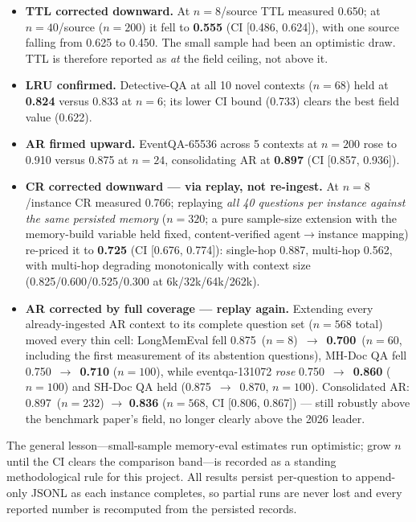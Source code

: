 \documentclass{article}
\begin{document}
\begin{itemize}
  \item \textbf{TTL corrected downward.} At $n{=}8$/source TTL measured 0.650;
        at $n{=}40$/source ($n{=}200$) it fell to \textbf{0.555}
        (CI [0.486, 0.624]), with one source falling from 0.625 to 0.450.
        The small sample had been an optimistic draw. TTL is therefore
        reported as \emph{at} the field ceiling, not above it.
  \item \textbf{LRU confirmed.} Detective-QA at all 10 novel contexts
        ($n{=}68$) held at \textbf{0.824} versus 0.833 at $n{=}6$; its lower
        CI bound (0.733) clears the best field value (0.622).
  \item \textbf{AR firmed upward.} EventQA-65536 across 5 contexts at
        $n{=}200$ rose to 0.910 versus 0.875 at $n{=}24$, consolidating AR at
        \textbf{0.897} (CI [0.857, 0.936]).
  \item \textbf{CR corrected downward --- via replay, not re-ingest.} At
        $n{=}8$/instance CR measured 0.766; replaying \emph{all 40 questions
        per instance against the same persisted memory} ($n{=}320$; a pure
        sample-size extension with the memory-build variable held fixed,
        content-verified agent$\to$instance mapping) re-priced it to
        \textbf{0.725} (CI [0.676, 0.774]): single-hop 0.887, multi-hop
        0.562, with multi-hop degrading monotonically with context size
        (0.825/0.600/0.525/0.300 at 6k/32k/64k/262k).
  \item \textbf{AR corrected by full coverage --- replay again.} Extending
        every already-ingested AR context to its complete question set
        ($n{=}568$ total) moved every thin cell: LongMemEval fell
        0.875~($n{=}8$)~$\to$~\textbf{0.700}~($n{=}60$, including the first
        measurement of its abstention questions), MH-Doc QA fell
        0.750~$\to$~\textbf{0.710} ($n{=}100$), while eventqa-131072
        \emph{rose} 0.750~$\to$~\textbf{0.860} ($n{=}100$) and SH-Doc QA held
        (0.875~$\to$~0.870, $n{=}100$). Consolidated AR: 0.897~($n{=}232$)
        $\to$ \textbf{0.836} ($n{=}568$, CI [0.806, 0.867]) --- still robustly
        above the benchmark paper's field, no longer clearly above the 2026
        leader.
\end{itemize}

The general lesson---small-sample memory-eval estimates run optimistic; grow
$n$ until the CI clears the comparison band---is recorded as a standing
methodological rule for this project. All results persist per-question to
append-only JSONL as each instance completes, so partial runs are never lost
and every reported number is recomputed from the persisted records.
\end{document}
